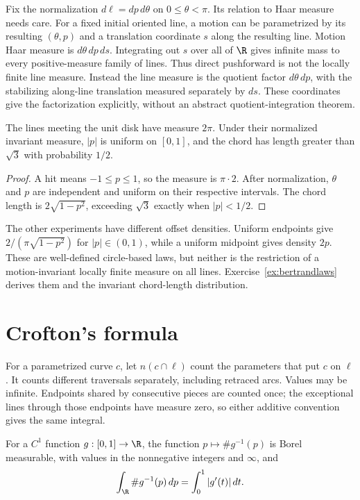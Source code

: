 Fix the normalization $d\ell=dp\,d\theta$ on $0\le\theta<\pi$. Its relation to Haar measure needs care. For a fixed initial oriented line, a motion can be parametrized by its resulting $(\theta,p)$ and a translation coordinate $s$ along the resulting line. Motion Haar measure is $d\theta\,dp\,ds$. Integrating out $s$ over all of $\R$ gives infinite mass to every positive-measure family of lines. Thus direct pushforward is not the locally finite line measure. Instead the line measure is the quotient factor $d\theta\,dp$, with the stabilizing along-line translation measured separately by $ds$. These coordinates give the factorization explicitly, without an abstract quotient-integration theorem.

\begin{corollary}\label{cor:bertrand}
The lines meeting the unit disk have measure $2\pi$. Under their normalized invariant measure, $|p|$ is uniform on $[0,1]$, and the chord has length greater than $\sqrt3$ with probability $1/2$.
\end{corollary}

\begin{proof}
A hit means $-1\le p\le1$, so the measure is $\pi\cdot2$. After normalization, $\theta$ and $p$ are independent and uniform on their respective intervals. The chord length is $2\sqrt{1-p^2}$, exceeding $\sqrt3$ exactly when $|p|<1/2$.
\end{proof}

The other experiments have different offset densities. Uniform endpoints give $2/(\pi\sqrt{1-p^2})$ for $|p|\in(0,1)$, while a uniform midpoint gives density $2p$. These are well-defined circle-based laws, but neither is the restriction of a motion-invariant locally finite measure on all lines. Exercise~\ref{ex:bertrandlaws} derives them and the invariant chord-length distribution.

\section{Crofton's formula}

For a parametrized curve $c$, let $n(c\cap\ell)$ count the parameters that put $c$ on $\ell$. It counts different traversals separately, including retraced arcs. Values may be infinite. Endpoints shared by consecutive pieces are counted once; the exceptional lines through those endpoints have measure zero, so either additive convention gives the same integral.

\begin{lemma}\label{lem:banach}
For a $C^1$ function $g:[0,1]\to\R$, the function $p\mapsto\#g^{-1}(p)$ is Borel measurable, with values in the nonnegative integers and $\infty$, and
\[
\int_{\R}\#g^{-1}(p)\,dp=\int_0^1|g'(t)|\,dt.
\]
\end{lemma}

